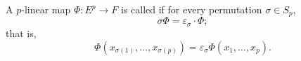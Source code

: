 A $p$-linear map $\Phi: E^p \to F$ is called  if for every permutation $\sigma \in S_p$,
$$\sigma \Phi = \varepsilon_\sigma \cdot \Phi;$$
that is,
$$\Phi(x_{\sigma(1)}, \ldots, x_{\sigma(p)}) = \varepsilon_\sigma \Phi(x_1, \ldots, x_p).$$
